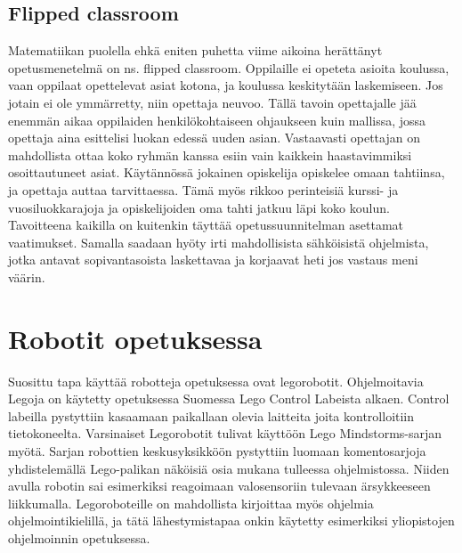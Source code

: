 \documentclass[utf8,bachelor]{gradu3}
\begin{document}
\subsection{Flipped classroom}
Matematiikan puolella \parencite[][]{maot} ehkä eniten puhetta viime aikoina herättänyt opetusmenetelmä on ns. flipped classroom.\parencite[][]{flipped} Oppilaille ei opeteta asioita koulussa, vaan oppilaat opettelevat asiat kotona, ja koulussa keskitytään laskemiseen. Jos jotain ei ole ymmärretty, niin opettaja neuvoo. Tällä tavoin opettajalle jää enemmän aikaa oppilaiden henkilökohtaiseen ohjaukseen kuin mallissa, jossa opettaja aina esittelisi luokan edessä uuden asian. Vastaavasti opettajan on mahdollista ottaa koko ryhmän kanssa esiin vain kaikkein haastavimmiksi osoittautuneet asiat. Käytännössä jokainen opiskelija opiskelee omaan tahtiinsa, ja opettaja auttaa tarvittaessa. Tämä myös rikkoo perinteisiä kurssi- ja vuosiluokkarajoja ja opiskelijoiden oma tahti jatkuu läpi koko koulun. Tavoitteena kaikilla on kuitenkin täyttää opetussuunnitelman asettamat vaatimukset. Samalla saadaan hyöty irti mahdollisista sähköisistä ohjelmista, jotka antavat sopivantasoista laskettavaa ja korjaavat heti jos vastaus meni väärin.








\section{Robotit opetuksessa}
Suosittu tapa käyttää robotteja opetuksessa ovat legorobotit. Ohjelmoitavia Legoja on käytetty opetuksessa Suomessa  Lego Control Labeista alkaen. \parencite[][]{skrolliRobot} Control labeilla pystyttiin kasaamaan paikallaan olevia laitteita joita kontrolloitiin tietokoneelta. Varsinaiset Legorobotit tulivat käyttöön Lego Mindstorms-sarjan myötä. Sarjan robottien keskusyksikköön pystyttiin luomaan komentosarjoja yhdistelemällä Lego-palikan näköisiä osia mukana tulleessa ohjelmistossa. Niiden avulla robotin sai esimerkiksi reagoimaan valosensoriin tulevaan ärsykkeeseen liikkumalla. Legoroboteille on mahdollista kirjoittaa myös ohjelmia ohjelmointikielillä, ja tätä lähestymistapaa onkin käytetty esimerkiksi yliopistojen ohjelmoinnin opetuksessa. \parencite[][]{korppirobo} \parencite[][]{hesarobo}
\end{document}

